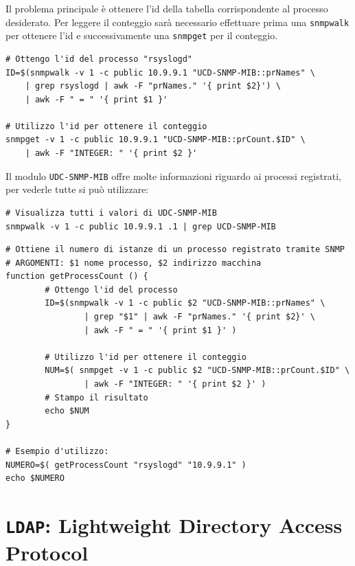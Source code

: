 \documentclass[a4paper]{report}
\newenvironment{info}{\begin{tcolorbox}[fonttitle=\sffamily\bfseries\large,title=Info,colframe=blue!75!white]}{\end{tcolorbox}}
\newenvironment{funzioni}{\begin{tcolorbox}[fonttitle=\sffamily\bfseries\large,title=Funzioni Utili,colframe=darkgreen!75!white]}{\end{tcolorbox}}
\newenvironment{code}{\begin{tcolorbox}[size=small]}{\end{tcolorbox}}
\begin{document}
Il problema principale è ottenere l'id della tabella corrispondente al processo desiderato. Per leggere il conteggio sarà necessario effettuare prima una \texttt{snmpwalk} per ottenere l'id e successivamente una \texttt{snmpget} per il conteggio.

\begin{code}
\begin{lstlisting}
# Ottengo l'id del processo "rsyslogd"
ID=$(snmpwalk -v 1 -c public 10.9.9.1 "UCD-SNMP-MIB::prNames" \
	| grep rsyslogd | awk -F "prNames." '{ print $2}') \
	| awk -F " = " '{ print $1 }'

# Utilizzo l'id per ottenere il conteggio
snmpget -v 1 -c public 10.9.9.1 "UCD-SNMP-MIB::prCount.$ID" \
	| awk -F "INTEGER: " '{ print $2 }'
\end{lstlisting}
\end{code}

\begin{info}
	Il modulo \texttt{UDC-SNMP-MIB} offre molte informazioni riguardo ai processi registrati, per vederle tutte si può utilizzare:
	\begin{lstlisting}
# Visualizza tutti i valori di UDC-SNMP-MIB
snmpwalk -v 1 -c public 10.9.9.1 .1 | grep UCD-SNMP-MIB
	\end{lstlisting}
\end{info}

\begin{funzioni}
\begin{lstlisting}
# Ottiene il numero di istanze di un processo registrato tramite SNMP
# ARGOMENTI: $1 nome processo, $2 indirizzo macchina
function getProcessCount () {
        # Ottengo l'id del processo
        ID=$(snmpwalk -v 1 -c public $2 "UCD-SNMP-MIB::prNames" \
                | grep "$1" | awk -F "prNames." '{ print $2}' \
                | awk -F " = " '{ print $1 }' )

        # Utilizzo l'id per ottenere il conteggio
        NUM=$( snmpget -v 1 -c public $2 "UCD-SNMP-MIB::prCount.$ID" \
                | awk -F "INTEGER: " '{ print $2 }' )
        # Stampo il risultato
        echo $NUM
}

# Esempio d'utilizzo:
NUMERO=$( getProcessCount "rsyslogd" "10.9.9.1" )
echo $NUMERO
\end{lstlisting}
\end{funzioni}

\chapter{\texttt{LDAP}: Lightweight Directory Access Protocol}
\end{document}
